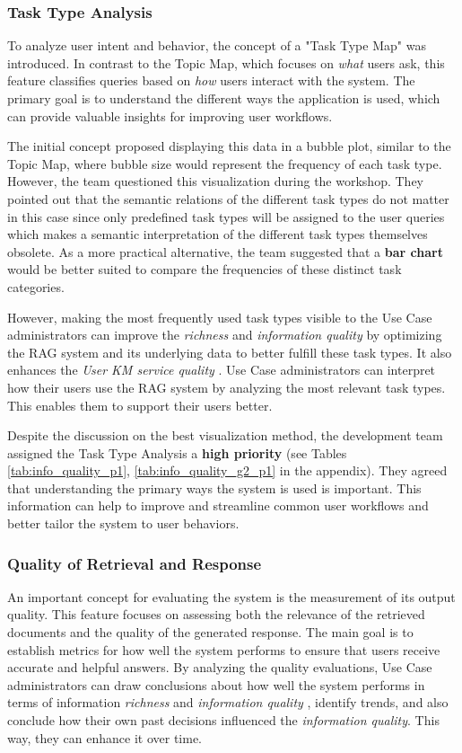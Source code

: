 \documentclass[
	english,
	ruledheaders=section,%
	class=report,%
	thesis={type=bachelor},%
	accentcolor=1b,%
	custommargins=true,%
	marginpar=false,%
	parskip=half-,%
	fontsize=11pt,%
	DIV=14,
]{tudapub}
\begin{document}
\subsubsection{Task Type Analysis}
To analyze user intent and behavior, the concept of a "Task Type Map" was introduced. In contrast to the Topic Map, which focuses on \textit{what} users ask, this feature classifies queries based on \textit{how} users interact with the system. The primary goal is to understand the different ways the application is used, which can provide valuable insights for improving user workflows.

The initial concept proposed displaying this data in a bubble plot, similar to the Topic Map, where bubble size would represent the frequency of each task type. However, the team questioned this visualization during the workshop. They pointed out that the semantic relations of the different task types do not matter in this case since only predefined task types will be assigned to the user queries which makes a semantic interpretation of the different task types themselves obsolete. As a more practical alternative, the team suggested that a \textbf{bar chart} would be better suited to compare the frequencies of these distinct task categories.

However, making the most frequently used task types visible to the Use Case administrators can improve the \textit{richness} and \textit{information quality} \parencite[pp.~57--58]{DeloneMcLean2003ISSuccessTenYearUpdate} by optimizing the RAG system and its underlying data to better fulfill these task types. It also enhances the \textit{User KM service quality} \parencite[pp.~58--59]{Jennex2006}. Use Case administrators can interpret how their users use the RAG system by analyzing the most relevant task types. This enables them to support their users better.

Despite the discussion on the best visualization method, the development team assigned the Task Type Analysis a \textbf{high priority} (see Tables \ref{tab:info_quality_p1}, \ref{tab:info_quality_g2_p1} in the appendix). They agreed that understanding the primary ways the system is used is important. This information can help to improve and streamline common user workflows and better tailor the system to user behaviors.
\subsubsection{Quality of Retrieval and Response}
An important concept for evaluating the system is the measurement of its output quality. This feature focuses on assessing both the relevance of the retrieved documents and the quality of the generated response. The main goal is to establish metrics for how well the system performs to ensure that users receive accurate and helpful answers. By analyzing the quality evaluations, Use Case administrators can draw conclusions about how well the system performs in terms of information \textit{richness} and \textit{information quality} \parencite[pp.~57--58]{DeloneMcLean2003ISSuccessTenYearUpdate}, identify trends, and also conclude how their own past decisions influenced the \textit{information quality}. This way, they can enhance it over time.
\end{document}
